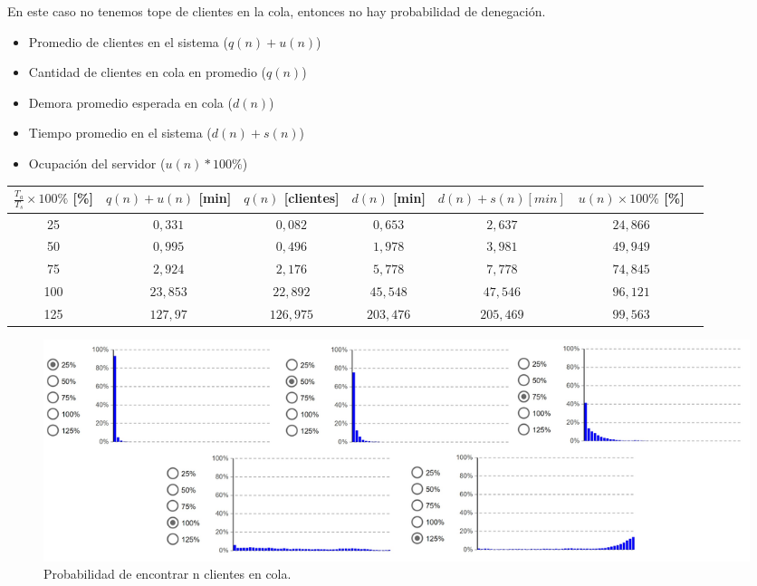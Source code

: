 En este caso no tenemos tope de clientes en la cola, entonces no hay probabilidad de denegación.

\begin{itemize}
    \item Promedio de clientes en el sistema ($q(n)+u(n)$)
    \item Cantidad de clientes en cola en promedio ($q(n)$)
    \item Demora promedio esperada en cola ($d(n)$)
    \item Tiempo promedio en el sistema ($d(n)+s(n)$)
    \item Ocupación del servidor ($u(n)*100\%$)
\end{itemize}

\begin{tabular}{||c||c|c|c|c|c|c||}
    \hline \hline
    $\frac{T_a}{T_s}\times100\%$ [\%] & $q(n)+u(n)$ [min] & $q(n)$ [clientes] & $d(n)$ [min] & $d(n)+s(n) [min]$ & $u(n)\times100\%$ [\%]\\
    \hline \hline
    25 & $0,331$ & $0,082$ & $0,653$ & $2,637$ & $24,866$ \\
    \hline
    50 & $0,995$ & $0,496$ & $1,978$ & $3,981$ & $49,949$ \\
    \hline
    75 & $2,924$ & $2,176$ & $5,778$ & $7,778$ & $74,845$ \\
    \hline
    100 & $23,853$ & $22,892$ & $45,548$ & $47,546$ & $96,121$ \\
    \hline
    125 & $127,97$ & $126,975$ & $203,476$ & $205,469$ & $99,563$ \\
    \hline \hline
\end{tabular}

\begin{figure}[H]
  \includegraphics[width=\linewidth]{images/anylogic-colas-50}
  \caption{Probabilidad de encontrar n clientes en cola.}
\end{figure}

